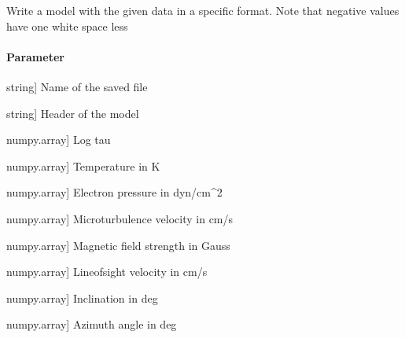\documentclass[letterpaper,10pt,english]{sphinxmanual}
\begin{document}
\begin{fulllineitems}
\label{\detokenize{functions:sir.write_model}}
\pysigstartsignatures
{}
\pysigstopsignatures
\sphinxAtStartPar
Write a model with the given data in a specific format. Note that negative values
have one white space less


\paragraph{Parameter}
\label{\detokenize{functions:id26}}\begin{description}
\sphinxlineitem{filename}{[}string{]}
\sphinxAtStartPar
Name of the saved file

\sphinxlineitem{Header}{[}string{]}
\sphinxAtStartPar
Header of the model

\sphinxlineitem{log\_tau}{[}numpy.array{]}
\sphinxAtStartPar
Log tau

\sphinxlineitem{T}{[}numpy.array{]}
\sphinxAtStartPar
Temperature in K

\sphinxlineitem{Pe}{[}numpy.array{]}
\sphinxAtStartPar
Electron pressure in dyn/cm\textasciicircum{}2

\sphinxlineitem{v\_micro}{[}numpy.array{]}
\sphinxAtStartPar
Microturbulence velocity in cm/s

\sphinxlineitem{B}{[}numpy.array{]}
\sphinxAtStartPar
Magnetic field strength in Gauss

\sphinxlineitem{vlos}{[}numpy.array{]}
\sphinxAtStartPar
Line\sphinxhyphen{}of\sphinxhyphen{}sight velocity in cm/s

\sphinxlineitem{inc}{[}numpy.array{]}
\sphinxAtStartPar
Inclination in deg

\sphinxlineitem{azimuth}{[}numpy.array{]}
\sphinxAtStartPar
Azimuth angle in deg


\end{description}
\end{fulllineitems}
\end{document}
